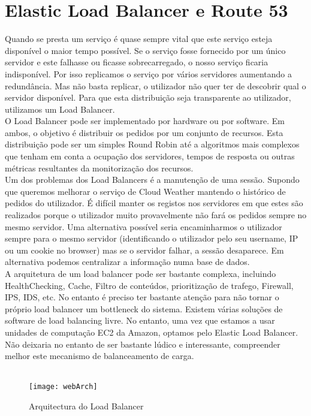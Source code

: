 \section{Elastic Load Balancer e Route 53}
Quando se presta um serviço é quase sempre vital que este serviço esteja disponível o maior tempo possível. Se o serviço fosse fornecido por um único servidor e este falhasse ou ficasse sobrecarregado, o nosso serviço ficaria indisponível. Por isso replicamos o serviço por vários servidores aumentando a redundância. Mas não basta replicar, o utilizador não quer ter de descobrir qual o servidor disponível. Para que esta distribuição seja transparente ao utilizador, utilizamos um Load Balancer.\\
O Load Balancer pode ser implementado por hardware ou por software. Em ambos, o objetivo é distribuir os pedidos por um conjunto de recursos. Esta distribuição pode ser um simples Round Robin até a algoritmos mais complexos que tenham em conta a ocupação dos servidores, tempos de resposta ou outras métricas resultantes da monitorização dos recursos.\\
Um dos problemas dos Load Balancers é a manutenção de uma sessão. Supondo que queremos melhorar o serviço de Cloud Weather mantendo o histórico de pedidos do utilizador. É difícil manter os registos nos servidores em que estes são realizados porque o utilizador muito provavelmente não fará os pedidos sempre no mesmo servidor. Uma alternativa possível seria encaminharmos o utilizador sempre para o mesmo servidor (identificando o utilizador pelo seu username, IP ou um cookie no browser) mas se o servidor falhar, a sessão desaparece. Em alternativa podemos centralizar a informação numa base de dados.\\
A arquitetura de um load balancer pode ser bastante complexa, incluindo HealthChecking, Cache, Filtro de conteúdos, prioritização de trafego, Firewall, IPS, IDS, etc. No entanto é preciso ter bastante atenção para não tornar o próprio load balancer um bottleneck do sistema. Existem várias soluções de software de load balancing livre. No entanto, uma vez que estamos a usar unidades de computação EC2 da Amazon, optamos pelo Elastic Load Balancer. Não deixaria no entanto de ser bastante lúdico e interessante, compreender melhor este mecanismo de balanceamento de carga.
\\
\\
\begin{figure}[htb]
\centering
\texttt{[image: webArch]}
\caption{Arquitectura do Load Balancer}
\label{fig:webArch}
\end{figure}

